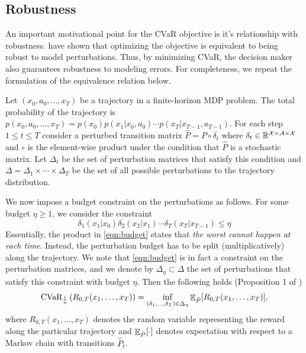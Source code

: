 \subsection{Robustness}

An important motivational point for the CVaR objective  is it's relationship with robustness. \citet{chow2015risk} have shown that optimizing the objective is equivalent to being robust to model perturbations. Thus, by minimizing CVaR, the decision maker also guarantees robustness to modeling errors. For completeness, we repeat the formulation of the equivalence relation below.

Let $(x_0, a_0, ..., x_T)$ be a trajectory in a finite-horizon MDP problem. The total probability of the trajectory is $p(x_0, a_0, ..., x_T)=p(x_0)p(x_1|x_0,a_0)\cdots p(x_T|x_{T-1}, a_{T-1})$. For each step $1\le t\le T$ consider a perturbed transition matrix $\hat{P} = P \circ \delta_t$ where $\delta_t \in \mathbb{R}^{\mathcal{X}\times\mathcal{A}\times\mathcal{X}}$ and $\circ$ is the element-wise product under the condition that $\hat{P}$ is a stochastic matrix. Let $\Delta_t$ be the set of perturbation matrices that satisfy this condition and $\Delta = \Delta_1 \times \cdots \times \Delta_T$ be the set of all possible perturbations to the trajectory distribution.

We now impose a budget constraint on the perturbations as follows. For some budget $\eta \geq 1$, we consider the constraint
\begin{equation}\label{eqn:budget}
    \delta_1(x_1|x_0)\delta_2(x_2|x_1)\cdots \delta_T(x_T|x_{T-1}) \leq \eta
\end{equation}
Essentially, the product in \eqref{eqn:budget} states that \emph{the worst cannot happen at each time}. Instead, the perturbation budget has to be split (multiplicatively) along the trajectory. We note that \eqref{eqn:budget} is in fact a constraint on the perturbation matrices, and we denote by $\Delta_\eta \subset \Delta$ the set of perturbations that satisfy this constraint with budget $\eta$.
Then the following holds (Proposition 1 of \citep{chow2015risk})
\begin{equation}\label{eq:CVaR_is_robustness}
    \text{CVaR}_{\frac{1}{\eta}} \left(R_{0,T}(x_1,\dots,x_T)\right) = \inf_{(\delta_1,\dots,\delta_T)\in \Delta_{\eta}} \mathop{\mathbb{E}}\nolimits_{\hat{P}}[R_{0,T}(x_1,\dots,x_T)],
\end{equation}
where $R_{0,T}(x_1,\dots,x_T)$ denotes the random variable representing the reward along the particular trajectory and $\mathop{\mathbb{E}}\nolimits_{\hat{P}}[\cdot]$ denotes expectation with respect to a Markov chain with transitions $\hat{P}_t$.


